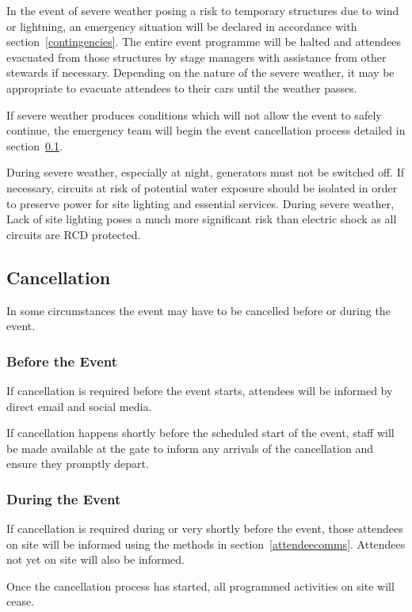 In the event of severe weather posing a risk to temporary structures due to wind or
lightning, an emergency situation will be declared in accordance with
section~\ref{contingencies}. The entire event programme will be halted and attendees
evacuated from those structures by stage managers with assistance from other stewards
if necessary. Depending on the nature of the severe weather, it may be appropriate to
evacuate attendees to their cars until the weather passes.

If severe weather produces conditions which will not allow the event to safely continue,
the emergency team will begin the event cancellation process detailed in
section~\ref{cancellation}.

During severe weather, especially at night, generators must not be switched off. If
necessary, circuits at risk of potential water exposure should be isolated in
order to preserve power for site lighting and essential services. During severe weather,
Lack of site lighting poses a much more significant risk than electric shock as all
circuits are RCD protected.

\subsection{Cancellation}\label{cancellation}
In some circumstances the event may have to be cancelled before or during the event.

\subsubsection{Before the Event}
If cancellation is required before the event starts, attendees will be informed by
direct email and social media. 

If cancellation happens shortly before the scheduled start of the event, staff will
be made available at the gate to inform any arrivals of the cancellation and ensure
they promptly depart.

\subsubsection{During the Event}
If cancellation is required during or very shortly before the event, those attendees
on site will be informed using the methods in section~\ref{attendeecomms}. Attendees
not yet on site will also be informed.

Once the cancellation process has started, all programmed activities on site will
cease.

